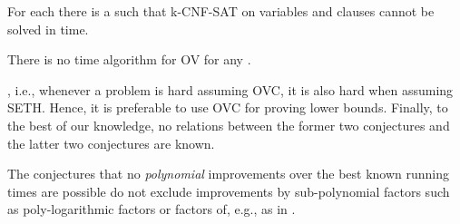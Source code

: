 \documentclass[11pt,letterpaper]{article}
\newif\iffullversion
\newcommand{\infull}[1]{\iffullversion #1\fi}
\newcommand{\inshort}[1]{\iffullversion \else #1\fi}
\begin{document}
\begin{conjecture}\label{conj:seth}
For each   there is a  such that k-CNF-SAT on  variables and  clauses
cannot be solved in  time.
\end{conjecture}

\begin{conjecture}\label{conj:ov}
There is no  time algorithm for \inshort{OV}\infull{the Orthogonal Vectors Problem} for any .
\end{conjecture}

\infull{By a result of Williams~\cite{Williams05} 
we know that SETH implies OVC}, i.e.,
whenever a problem is hard assuming OVC, it is also hard when assuming SETH.
Hence, it is preferable to use OVC for proving lower bounds.
Finally, to the best of our knowledge, no relations between the former two conjectures and the latter two conjectures 
are known.
\begin{remark}
	The conjectures that no \emph{polynomial} improvements over the best known
	running times are possible do not exclude improvements by sub-polynomial 
	factors such as poly-logarithmic factors or factors of, e.g., 
	as in \cite{Williams14a}.
\end{remark}
\end{document}
